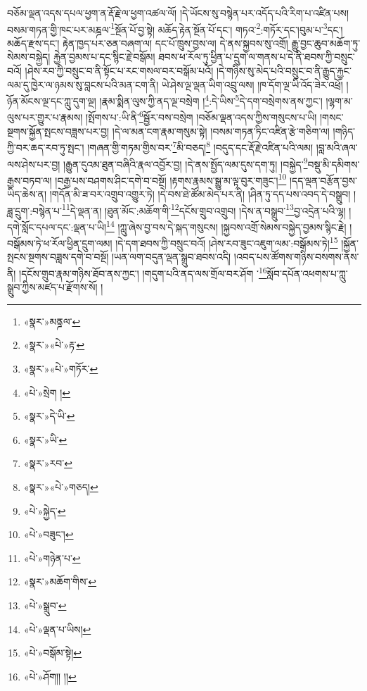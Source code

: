བཅོམ་ལྡན་འདས་དཔལ་ཕྱག་ན་རྡོ་རྗེ་ལ་ཕྱག་འཚལ་ལོ། །དེ་ཡོངས་སུ་བསྙེན་པར་འདོད་པའི་རིག་པ་འཛིན་པས། བསམ་གཏན་གྱི་ཁང་པར་མཎྜལ་\footnote{«སྣར་»མནྜལ་}སྔོན་པོ་བྱ་སྟེ། མཆོད་རྟེན་སྔོན་པོ་དང་། གཏའ་\footnote{«སྣར་»«པེ་»རྟ་}:གཏོར་དང་།བུམ་པ་\footnote{«སྣར་»«པེ་»གཏོར་}དང་། མཆོད་རྫས་དང་། རྟེན་ཁྱད་པར་ཅན་བཞག་ལ། དང་པོ་ཁྲུས་བྱས་ལ། དེ་ནས་སྐྱབས་སུ་འགྲོ། རྒྱུ་བྱང་ཆུབ་མཆོག་ཏུ་སེམས་བསྐྱེད། རྐྱེན་བྱམས་པ་དང་སྙིང་རྗེ་བསྒོམ། ཐབས་ཕ་རོལ་ཏུ་ཕྱིན་པ་དྲུག་ལ་གནས་པ་དེ་ནི་ཐབས་ཀྱི་བསྲུང་བའོ། །ཤེས་རབ་ཀྱི་བསྲུང་བ་ནི་སྟོང་པ་རང་གསལ་བར་བསྒོམ་པའོ། །དེ་གཉིས་སུ་མེད་པའི་བསྲུང་བ་ནི་རྒྱུད་རྐྱང་ལམ་དུ་ཁྱེར་ལ་ཉམས་སུ་བླངས་པའི་མན་ངག་ནི། ཡེ་ཤེས་ལྔ་ལྡན་ཡིག་འབྲུ་ལས། །ཁ་དོག་ལྔ་ཡི་འོད་ཟེར་འཕྲོ། །ཉོན་མོངས་ལྔ་དང་ཀླུ་དུག་ལྔ། །རྣམ་སྨིན་ལུས་ཀྱི་ནད་ལྔ་བསྲེག །\footnote{«པེ་»སྲེག །}:དེ་ཡིས་\footnote{«སྣར་»དེ་ཡི་}དེ་དག་བསྲེགས་ནས་ཀྱང་། །ལྷག་མ་ལུས་པར་གྱུར་པ་རྣམས། །སྤོགས་པ་:ཡི་ནི་\footnote{«སྣར་»ཡི་}སྦྱོར་བས་བསྲེག །བཅོམ་ལྡན་འདས་ཀྱིས་གསུངས་པ་ཡི། །གསང་སྔགས་སྐྱོན་སྤངས་བཟླས་པར་བྱ། །དེ་ལ་མན་ངག་རྣམ་གསུམ་སྟེ། །བསམ་གཏན་ཏིང་འཛིན་རྩེ་གཅིག་ལ། །གཉིད་ཀྱི་བར་ཆད་རབ་ཏུ་སྤང་། །གཞན་གྱི་གཏམ་གྱིས་བར་\footnote{«སྣར་»རབ་}མི་བཅད།\footnote{«སྣར་»«པེ་»གཅད།} །བདུད་དང་རྡོ་རྗེ་འཛིན་པའི་ལམ། །བླ་མའི་ཞལ་ལས་ཤེས་པར་བྱ། །རྒྱུན་དུའམ་ཐུན་བཞིའི་རྣལ་འབྱོར་བྱ། །དེ་ནས་སྤྱོད་ལམ་དུས་དག་ཏུ། །བསྐྱེད་\footnote{«པེ་»སྐྱེད་}བསྡུ་མི་དམིགས་རྒྱས་བཏབ་ལ། །བརྒྱ་པས་བཤགས་ཤིང་དགེ་བ་བསྔོ། །རྟགས་རྣམས་སྒྱུ་མ་ལྟ་བུར་གཟུང་།\footnote{«པེ་»བཟུང་།} །དད་ལྡན་བརྩོན་བྱས་ཡིད་ཆེས་ན། །གདོན་མི་ཟ་བར་འགྲུབ་འགྱུར་ཏེ། །དེ་བས་ཐེ་ཚོམ་མེད་པར་ནི། །ཤིན་ཏུ་དད་པས་འབད་དེ་བསྒྲུབ། །ཟླ་དྲུག་:བསྙེན་པ་\footnote{«པེ་»གཉེན་པ་}དེ་ལྡན་ན། །ཐུན་མོང་:མཆོག་གི་\footnote{«སྣར་»མཆོག་གིས་}དངོས་གྲུབ་འགྲུབ། །དེས་ན་བསྒྲུབ་\footnote{«པེ་»སྒྲུབ་}བྱ་འདྲེན་པའི་ལྷ། །དགེ་སློང་དཔལ་དང་:ལྡན་པ་ཡི།\footnote{«པེ་»ལྡན་པ་ཡིས།} །ཀླུ་ཞེས་བྱ་བས་དེ་སྐད་གསུངས། །སྐྱབས་འགྲོ་སེམས་བསྐྱེད་བྱམས་སྙིང་རྗེ། །བསྒོམས་ཏེ་ཕ་རོལ་ཕྱིན་དྲུག་ལམ། །དེ་དག་ཐབས་ཀྱི་བསྲུང་བའོ། །ཤེས་རབ་ཟུང་འཇུག་ལམ་:བསྒོམས་ཏེ།\footnote{«པེ་»བསྒོམ་སྟེ།} །སྐྱོན་སྤངས་སྔགས་བཟླས་དགེ་བ་བསྔོ། །ཡན་ལག་བདུན་ལྡན་སྒྲུབ་ཐབས་འདི། །འབད་པས་ཚོགས་གཉིས་བསགས་ནས་ནི། །དངོས་གྲུབ་རྣམ་གཉིས་ཐོབ་ནས་ཀྱང་། །གདུག་པའི་ནད་ལས་གྲོལ་བར་ཤོག ་\footnote{«པེ་»ཤོག།། །།}སློབ་དཔོན་འཕགས་པ་ཀླུ་སྒྲུབ་ཀྱིས་མཛད་པ་རྫོགས་སོ། ། 
